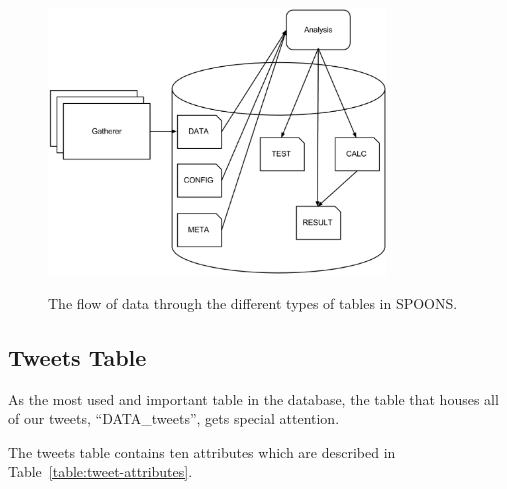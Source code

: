 \documentclass[12pt]{ucthesis}
\newcommand{\captionfonts}{\small\bf\ssp}
\begin{document}
\begin{figure}
   \begin{center}
      \includegraphics[width=0.8\textwidth]{images/DB_Data_Flow.eps}
      \captionfonts
      \caption[Database Data Flow]{The flow of data through the different types of tables in SPOONS.}
      \label{fig:db-data-flow}
   \end{center}
\end{figure}

\subsection{Tweets Table}
\label{arch-database-tables-tweets}
As the most used and important table in the database, the table that houses all of our tweets, ``DATA\_tweets'', gets special attention.

The tweets table contains ten attributes which are described in Table~\ref{table:tweet-attributes}.
\end{document}
